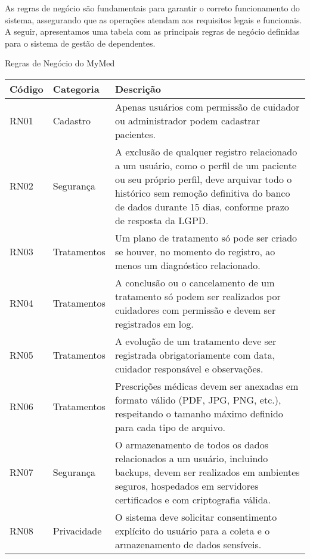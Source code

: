 As regras de negócio são fundamentais para garantir o correto funcionamento do sistema, assegurando que as operações atendam aos requisitos legais e funcionais. A seguir, apresentamos uma tabela com as principais regras de negócio definidas para o sistema de gestão de dependentes.

\begin{quadro}
\caption{Regras de Negócio do MyMed}
\begin{tabularx}{\textwidth}{|l|l|X|}
\hline
\textbf{Código} & \textbf{Categoria} & \textbf{Descrição} \\ \hline
RN01 & Cadastro & Apenas usuários com permissão de cuidador ou administrador podem cadastrar pacientes. \\ \hline
RN02 & Segurança & A exclusão de qualquer registro relacionado a um usuário, como o perfil de um paciente ou seu próprio perfil, deve arquivar todo o histórico sem remoção definitiva do banco de dados durante 15 dias, conforme prazo de resposta da LGPD. \\ \hline
RN03 & Tratamentos & Um plano de tratamento só pode ser criado se houver, no momento do registro, ao menos um diagnóstico relacionado. \\ \hline
RN04 & Tratamentos & A conclusão ou o cancelamento de um tratamento só podem ser realizados por cuidadores com permissão e devem ser registrados em log. \\ \hline
RN05 & Tratamentos & A evolução de um tratamento deve ser registrada obrigatoriamente com data, cuidador responsável e observações. \\ \hline
RN06 & Tratamentos & Prescrições médicas devem ser anexadas em formato válido (PDF, JPG, PNG, etc.), respeitando o tamanho máximo definido para cada tipo de arquivo. \\ \hline
RN07 & Segurança & O armazenamento de todos os dados relacionados a um usuário, incluindo backups, devem ser realizados em ambientes seguros, hospedados em servidores certificados e com criptografia válida. \\ \hline
RN08 & Privacidade & O sistema deve solicitar consentimento explícito do usuário para a coleta e o armazenamento de dados sensíveis. \\ \hline
\end{tabularx}
\end{quadro}